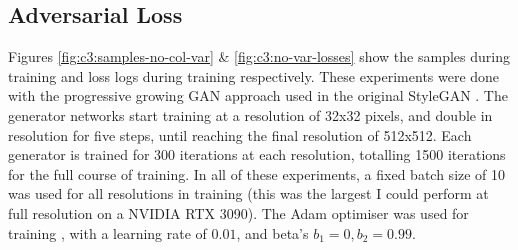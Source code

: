 \subsection{Adversarial Loss}

\label{c3:sec:adv-loss}

Figures \ref{fig:c3:samples-no-col-var} \& \ref{fig:c3:no-var-losses} show the samples during training and loss logs during training respectively.
These experiments were done with the progressive growing GAN approach \citep{karras2017progressive} used in the original StyleGAN \citep{karras2019style}.
The generator networks start training at a resolution of 32x32 pixels, and double in resolution for five steps, until reaching the final resolution of 512x512. 
Each generator is trained for 300 iterations at each resolution, totalling 1500 iterations for the full course of training.
In all of these experiments, a fixed batch size of 10 was used for all resolutions in training (this was the largest I could perform at full resolution on a NVIDIA RTX 3090). 
The Adam optimiser was used for training \citep{kingma2014adam}, with a learning rate of $0.01$, and beta's $b_{1} = 0, b_{2} = 0.99$.



